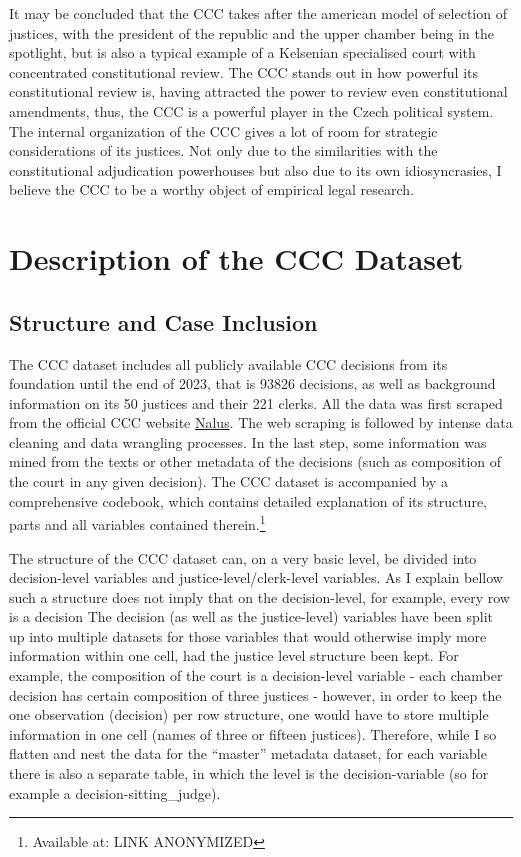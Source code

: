 \documentclass[
  11pt,
]{article}
\begin{document}
It may be concluded that the CCC takes after the american model of
selection of justices, with the president of the republic and the upper
chamber being in the spotlight, but is also a typical example of a
Kelsenian specialised court with concentrated constitutional review. The
CCC stands out in how powerful its constitutional review is, having
attracted the power to review even constitutional amendments, thus, the
CCC is a powerful player in the Czech political system. The internal
organization of the CCC gives a lot of room for strategic considerations
of its justices. Not only due to the similarities with the
constitutional adjudication powerhouses but also due to its own
idiosyncrasies, I believe the CCC to be a worthy object of empirical
legal research.

\hypertarget{description-of-the-ccc-dataset}{%
\section{Description of the CCC
Dataset}\label{description-of-the-ccc-dataset}}

\hypertarget{structure-and-case-inclusion}{%
\subsection{Structure and Case
Inclusion}\label{structure-and-case-inclusion}}

The CCC dataset includes all publicly available CCC decisions from its
foundation until the end of 2023, that is 93826 decisions, as well as
background information on its 50 justices and their 221 clerks. All the
data was first scraped from the official CCC website
\href{https://nalus.usoud.cz/Search/Search.aspx}{Nalus}. The web
scraping is followed by intense data cleaning and data wrangling
processes. In the last step, some information was mined from the texts
or other metadata of the decisions (such as composition of the court in
any given decision). The CCC dataset is accompanied by a comprehensive
codebook, which contains detailed explanation of its structure, parts
and all variables contained therein.\footnote{Available at: LINK
  ANONYMIZED}

The structure of the CCC dataset can, on a very basic level, be divided
into decision-level variables and justice-level/clerk-level variables.
As I explain bellow such a structure does not imply that on the
decision-level, for example, every row is a decision The decision (as
well as the justice-level) variables have been split up into multiple
datasets for those variables that would otherwise imply more information
within one cell, had the justice level structure been kept. For example,
the composition of the court is a decision-level variable - each chamber
decision has certain composition of three justices - however, in order
to keep the one observation (decision) per row structure, one would have
to store multiple information in one cell (names of three or fifteen
justices). Therefore, while I so flatten and nest the data for the
``master'' metadata dataset, for each variable there is also a separate
table, in which the level is the decision-variable (so for example a
decision-sitting\_judge).
\end{document}

